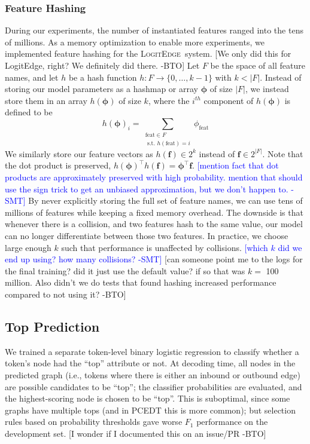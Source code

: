 \documentclass[11pt]{article}
\newcommand{\bocomment}[1]{\textcolor{Bittersweet}{[#1 -BTO]}}
\newcommand{\sam}[1]{\textcolor{blue}{[#1 -SMT]}}
\newcommand{\logitedge}{\textsc{LogitEdge}}
\begin{document}
\subsubsection{Feature Hashing}

During our experiments, the number of instantiated features ranged into the tens
of millions.
As a memory optimization to enable more experiments,
we implemented feature hashing
\cite{weinberger_feature_2009} for the \logitedge\ system.
\bocomment{We only did this for LogitEdge, right? We definitely did there.}
Let $F$ be the space of all feature names, and let $h$ be a hash function
$h : F \rightarrow \{0, \ldots, k-1\}$ with $k < |F|$.
Instead of storing our model parameters as a
hashmap %
or array $\bm\phi$ of size $|F|$, we instead store them in an array
$h(\bm\phi)$ of size $k$, where the $i^{th}$ component of $h(\bm\phi)$ is
defined to be
\[
h(\bm\phi)_i = \sum_{\substack{\text{feat} \in F \\\text{ s.t. }
h(\text{feat})=i}}{\phi_{\text{feat}}}
\]
We similarly store our feature vectors as $h(\bm{f}) \in 2^k$ instead of
$\bm{f} \in 2^{|F|}$.
Note that the dot product is preserved,
$h(\bm\phi)^\top h(\bm{f}) = \bm\phi^\top \bm{f}$.
\sam{mention fact that dot products are approximately
preserved with high probability.
mention that should use the sign trick to get an unbiased approximation, but
we don't happen to.}
By never explicitly storing the full set of feature names, we can use
tens of millions of features while keeping a fixed memory overhead.
The downside is that whenever there is a collision, and two features hash to the
same value, our model can no longer differentiate between those two features.
In practice, we choose large enough $k$ such that performance is unaffected by
collisions.
\sam{which $k$ did we end up using? how many collisions?}
\bocomment{can someone point me to the logs for the final training? did it just use the default value? if so that was $k=$ 100 million.  Also didn't we do tests that found hashing increased performance compared to not using it?}


\subsection{Top Prediction} \label{s:top_model}

We trained a separate token-level binary logistic regression to classify
whether a token's node had the ``top'' attribute or not.
At decoding time, all nodes in the predicted graph (i.e., tokens where there is
either an inbound or outbound edge) are possible candidates to be ``top'';
the classifier probabilities are evaluated, and the highest-scoring node is
chosen to be ``top''.
This is suboptimal, since some graphs have multiple tops (and in PCEDT this is
more common);
but selection rules based on probability thresholds gave worse $F_1$
performance on the development set. \bocomment{I wonder if I documented this on
an issue/PR}
\end{document}
